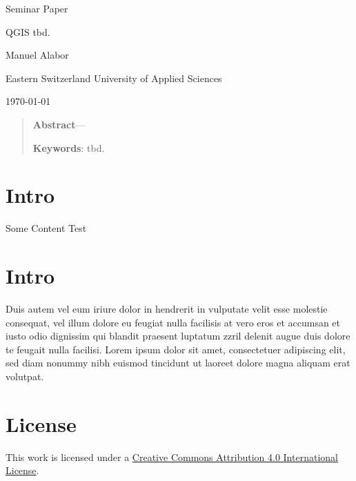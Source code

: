 \documentclass[12pt,a4paper]{article}
\begin{document}
\begin{centering}
	\Large{Seminar Paper}
	\par
	\Huge{QGIS tbd.}
	\par
	\vspace{2ex}

	\normalsize{
		Manuel Alabor\\
		\par
		\vspace{2ex}
		Eastern Switzerland University of Applied Sciences\\
		\par
		\vspace{2ex}
		\today{}
	}
	\par
	\vspace{2ex}

	\begin{quotation}
		\small{
			\noindent\textbf{Abstract}---
		}
		\par
		\vspace{2ex}

		\small{
			\noindent\textbf{Keywords}: tbd.
		}
		\par
		\vspace{4ex}
	\end{quotation}
\end{centering}

\section{Intro}
Some Content \cite{Author:Year:Abbr:1111111}
Test

\section{Intro}
Duis autem vel eum iriure dolor in hendrerit in vulputate velit esse molestie consequat, vel illum dolore eu feugiat nulla facilisis at vero eros et accumsan et iusto odio dignissim qui blandit praesent luptatum zzril delenit augue duis dolore te feugait nulla facilisi. Lorem ipsum dolor sit amet, consectetuer adipiscing elit, sed diam nonummy nibh euismod tincidunt ut laoreet dolore magna aliquam erat volutpat.




\section*{License}
\ccby\thinspace\thinspace This work is licensed under a \href{https://creativecommons.org/licenses/by/4.0/}{Creative Commons Attribution 4.0 International License}.
\end{document}
